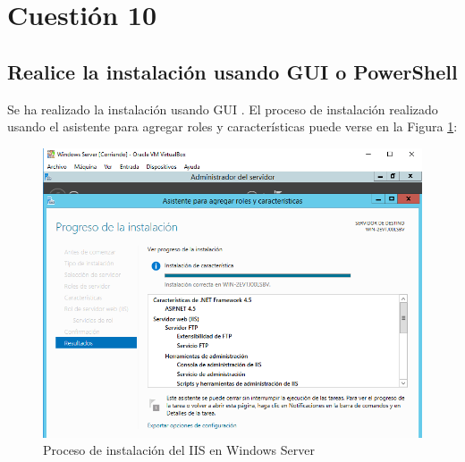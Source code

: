 \newpage

\section{Cuestión 10}
\subsection{Realice la instalación usando GUI o PowerShell}
	
	Se ha realizado la instalación usando GUI \cite{enlace23}.
	El proceso de instalación realizado usando el asistente para agregar roles y características puede verse en la Figura \ref{fig:figura36}:
	\begin{figure}[H]	
		\centering	
		\includegraphics[scale=0.4]{figuras/figura36.png} 
		\caption{Proceso de instalación del IIS en Windows Server} 
		\label{fig:figura36}
	\end{figure}

